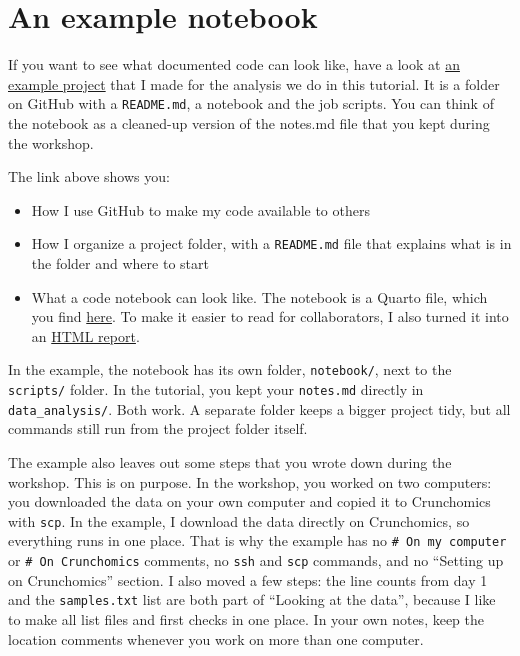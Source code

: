 \documentclass[
  letterpaper,
  DIV=11,
  numbers=noendperiod]{scrreprt}
\author{}
\date{}
\providecommand{\tightlist}{%
  \setlength{\itemsep}{0pt}\setlength{\parskip}{0pt}}
\renewcommand*\contentsname{Table of contents}
\newcommand\contentsname{Table of contents}
\begin{document}

\renewcommand*\contentsname{Table of contents}
{
\hypersetup{linkcolor=}
\setcounter{tocdepth}{1}
\tableofcontents
}

\section{An example notebook}\label{an-example-notebook}

If you want to see what documented code can look like, have a look at
\href{https://github.com/ndombrowski/cli_workshop/tree/main/example_doc}{an
example project} that I made for the analysis we do in this tutorial. It
is a folder on GitHub with a \texttt{README.md}, a notebook and the job
scripts. You can think of the notebook as a cleaned-up version of the
notes.md file that you kept during the workshop.

The link above shows you:

\begin{itemize}
\tightlist
\item
  How I use GitHub to make my code available to others
\item
  How I organize a project folder, with a \texttt{README.md} file that
  explains what is in the folder and where to start
\item
  What a code notebook can look like. The notebook is a Quarto file,
  which you find
  \href{https://github.com/ndombrowski/cli_workshop/blob/main/example_doc/notebook/example_notebook.qmd}{here}.
  To make it easier to read for collaborators, I also turned it into an
  \href{https://ndombrowski.github.io/cli_workshop/example_doc/notebook/example_notebook.html}{HTML
  report}.
\end{itemize}

In the example, the notebook has its own folder, \texttt{notebook/},
next to the \texttt{scripts/} folder. In the tutorial, you kept your
\texttt{notes.md} directly in \texttt{data\_analysis/}. Both work. A
separate folder keeps a bigger project tidy, but all commands still run
from the project folder itself.

The example also leaves out some steps that you wrote down during the
workshop. This is on purpose. In the workshop, you worked on two
computers: you downloaded the data on your own computer and copied it to
Crunchomics with \texttt{scp}. In the example, I download the data
directly on Crunchomics, so everything runs in one place. That is why
the example has no \texttt{\#\ On\ my\ computer} or
\texttt{\#\ On\ Crunchomics} comments, no \texttt{ssh} and \texttt{scp}
commands, and no ``Setting up on Crunchomics'' section. I also moved a
few steps: the line counts from day 1 and the \texttt{samples.txt} list
are both part of ``Looking at the data'', because I like to make all
list files and first checks in one place. In your own notes, keep the
location comments whenever you work on more than one computer.
\end{document}

